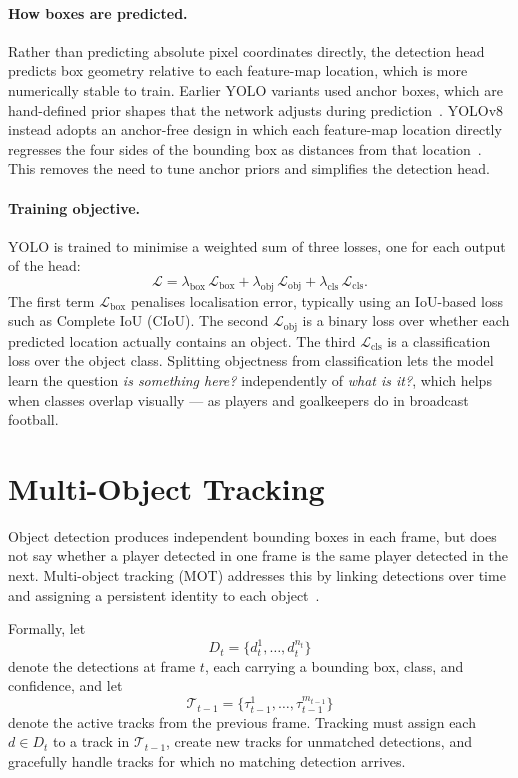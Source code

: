 \paragraph{How boxes are predicted.} Rather than predicting absolute pixel
coordinates directly, the detection head predicts box geometry relative to each
feature-map location, which is more numerically stable to train. Earlier
YOLO variants used anchor boxes, which are hand-defined prior shapes that the
network adjusts during prediction~\cite{redmon2018yolov3}. YOLOv8 instead adopts
an anchor-free design in which each feature-map location directly regresses the
four sides of the bounding box as distances from that location~\cite{Jocher2023}.
This removes the need to tune anchor priors and simplifies the detection head.

\paragraph{Training objective.} YOLO is trained to 
minimise a weighted sum of three losses, one for each 
output of the head:
\[
    \mathcal{L} =
    \lambda_{\mathrm{box}}\,\mathcal{L}_{\mathrm{box}} +
    \lambda_{\mathrm{obj}}\,\mathcal{L}_{\mathrm{obj}} +
    \lambda_{\mathrm{cls}}\,\mathcal{L}_{\mathrm{cls}}.
\]
The first term \(\mathcal{L}_{\mathrm{box}}\) penalises 
localisation error, typically using an IoU-based loss such
as Complete IoU (CIoU). The second \(\mathcal{L}_{\mathrm{obj}}\) is a 
binary loss over whether each predicted location actually 
contains an object. The third \(\mathcal{L}_{\mathrm{cls}}\) 
is a classification loss over the object class. Splitting 
objectness from classification lets the model learn the 
question \emph{is something here?} independently of 
\emph{what is it?}, which helps when classes overlap 
visually — as players and goalkeepers do in broadcast 
football.

\section{Multi-Object Tracking}
\label{sec:background_tracking}

Object detection produces independent bounding boxes in 
each frame, but does not say whether a player detected in 
one frame is the same player detected in the next. 
Multi-object tracking (MOT) addresses this by linking 
detections over time and assigning a persistent identity 
to each object~\cite{MOTChallenge2021}.

Formally, let
\begin{equation}
    D_t = \{d_t^1, \dots, d_t^{n_t}\}
    \label{eq:detections_t}
\end{equation}
denote the detections at frame \(t\), each carrying a 
bounding box, class, and confidence, and let
\begin{equation}
    \mathcal{T}_{t-1} =
    \{\tau_{t-1}^1, \dots, \tau_{t-1}^{m_{t-1}}\}
    \label{eq:tracks_t}
\end{equation}
denote the active tracks from the previous frame. Tracking 
must assign each \(d \in D_t\) to a track in 
\(\mathcal{T}_{t-1}\), create new tracks for unmatched 
detections, and gracefully handle tracks for which no 
matching detection arrives.


